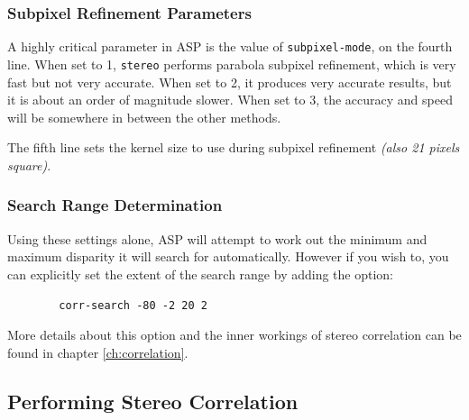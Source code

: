 \subsubsection*{Subpixel Refinement Parameters}

A highly critical parameter in \ac{ASP} is the value of
\texttt{subpixel-mode}, on the fourth line. When set to 1,
\texttt{stereo} performs parabola subpixel refinement, which is very
fast but not very accurate. When set to 2, it produces very accurate
results, but it is about an order of magnitude slower. When set to 3,
the accuracy and speed will be somewhere in between the other methods.

The fifth line sets the kernel size to use during subpixel refinement
\textit{(also 21 pixels square)}.

\subsubsection*{Search Range Determination}

Using these settings alone, \ac{ASP} will attempt to work out the
minimum and maximum disparity it will search for automatically. However if you
wish to, you can explicitly set the extent of the search range by
adding the option:
\begin{verbatim}
        corr-search -80 -2 20 2
\end{verbatim}

More details about this option and the inner workings of stereo correlation
can be found in chapter \ref{ch:correlation}.

\subsection{Performing Stereo Correlation}\label{perform-stereo}

